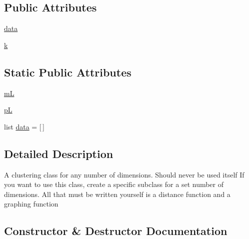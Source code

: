 \subsection*{Public Attributes}
\begin{DoxyCompactItemize}
\item 
\mbox{\hyperlink{classdynamicfilterapp_1_1simulation__files_1_1cluster_1_1_clusterk_d_a511ae0b1c13f95e5f08f1a0dd3da3d93}{data}}
\item 
\mbox{\hyperlink{classdynamicfilterapp_1_1simulation__files_1_1cluster_1_1_clusterk_d_adc468c70fb574ebd07287b38d0d0676d}{k}}
\end{DoxyCompactItemize}
\subsection*{Static Public Attributes}
\begin{DoxyCompactItemize}
\item 
\mbox{\hyperlink{classdynamicfilterapp_1_1simulation__files_1_1cluster_1_1_clusterk_d_a3bf8bfc2a8d2d473a97085c452b7bf4e}{mL}}
\item 
\mbox{\hyperlink{classdynamicfilterapp_1_1simulation__files_1_1cluster_1_1_clusterk_d_abcc44a80b1ae4089dbfbaf1ac899b904}{pL}}
\item 
list \mbox{\hyperlink{classdynamicfilterapp_1_1simulation__files_1_1cluster_1_1_clusterk_d_a018aaab493af92ea83348b0db6e32328}{data}} = \mbox{[}$\,$\mbox{]}
\end{DoxyCompactItemize}


\subsection{Detailed Description}
\begin{DoxyVerb}A clustering class for any number of dimensions. Should never be used itself
If you want to use this class, create a specific subclass for a set number
of dimensions. All that must be written yourself is a distance function and
a graphing function
\end{DoxyVerb}
 

\subsection{Constructor \& Destructor Documentation}
\mbox{\label{classdynamicfilterapp_1_1simulation__files_1_1cluster_1_1_clusterk_d_a49caefaf73ad77cd09e9fdf908975c43}} 
